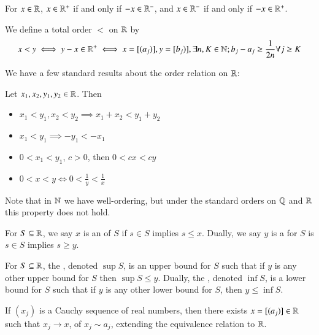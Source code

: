 \begin{proposition}
    For $x \in \mathbb R$, $x \in \mathbb R^+$ if and only if $-x \in \mathbb R^-$, and $x \in \mathbb R^-$ if and only if $-x \in \mathbb R^+$.
\end{proposition}

\begin{definition}
    We define a total order $<$ on $\R$ by $$x < y \iff y-x \in \mathbb R^+ \iff x = [(a_j)],y=[b_j)],\exists n,K \in \mathbb N;b_j-a_j \geq \frac{1}{2n}\forall j \geq K$$
\end{definition}

We have a few standard results about the order relation on $\R$: 

\begin{proposition}\label{prop:1.6.4}
    Let $x_1,x_2,y_1,y_2 \in \mathbb R$. Then \begin{itemize}
        \item $x_1 < y_1, x_2 < y_2 \implies x_1+x_2 < y_1 + y_2$
        \item $x_1 < y_1 \implies -y_1 < -x_1$
        \item $0 < x_1 < y_1$, $c > 0$, then $0 < cx < cy$
        \item $0 < x < y \iff 0 < \frac{1}{y} < \frac{1}{x}$
    \end{itemize}
\end{proposition}

Note that in $\mathbb N$ we have well-ordering, but under the standard orders on $\mathbb Q$ and $\R$ this property does not hold.

\begin{definition}
    For $S \subseteq \mathbb R$, we say $x$ is an  of $S$ if $s \in S$ implies $s \leq x$. Dually, we say $y$ is a  for $S$ is $s \in S$ implies $s \geq y$.
\end{definition}

\begin{definition}
    For $S \subseteq \mathbb R$, the , denoted $\sup S$, is an upper bound for $S$ such that if $y$ is any other upper bound for $S$ then $\sup S \leq y$. Dually, the , denoted $\inf S$, is a lower bound for $S$ such that if $y$ is any other lower bound for $S$, then $y \leq \inf S$.
\end{definition}

\begin{theorem}[Completeness of $\R$]
    If $(x_j)$ is a Cauchy sequence of real numbers, then there exists $x = [(a_j)] \in \mathbb R$ such that $x_j \rightarrow x$, of $x_j \sim a_j$, extending the equivalence relation to $\R$.
\end{theorem}


